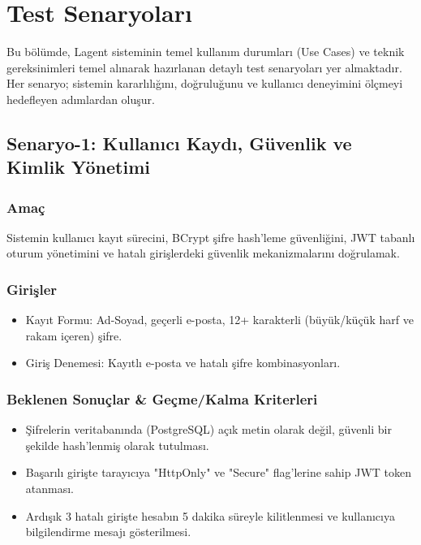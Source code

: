 \documentclass[12pt,a4paper]{article}
\begin{document}
\section{Test Senaryoları}

Bu bölümde, Lagent sisteminin temel kullanım durumları (Use Cases) ve teknik gereksinimleri temel alınarak hazırlanan detaylı test senaryoları yer almaktadır. Her senaryo; sistemin kararlılığını, doğruluğunu ve kullanıcı deneyimini ölçmeyi hedefleyen adımlardan oluşur.

\subsection{Senaryo-1: Kullanıcı Kaydı, Güvenlik ve Kimlik Yönetimi}
\subsubsection{Amaç}
Sistemin kullanıcı kayıt sürecini, BCrypt şifre hash'leme güvenliğini, JWT tabanlı oturum yönetimini ve hatalı girişlerdeki güvenlik mekanizmalarını doğrulamak.

\subsubsection{Girişler}
\begin{itemize}
    \item Kayıt Formu: Ad-Soyad, geçerli e-posta, 12+ karakterli (büyük/küçük harf ve rakam içeren) şifre.
    \item Giriş Denemesi: Kayıtlı e-posta ve hatalı şifre kombinasyonları.
\end{itemize}

\subsubsection{Beklenen Sonuçlar \& Geçme/Kalma Kriterleri}
\begin{itemize}
    \item Şifrelerin veritabanında (PostgreSQL) açık metin olarak değil, güvenli bir şekilde hash'lenmiş olarak tutulması.
    \item Başarılı girişte tarayıcıya "HttpOnly" ve "Secure" flag'lerine sahip JWT token atanması.
    \item Ardışık 3 hatalı girişte hesabın 5 dakika süreyle kilitlenmesi ve kullanıcıya bilgilendirme mesajı gösterilmesi.
\end{itemize}
\end{document}
